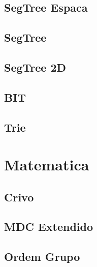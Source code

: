 \documentclass[12pt, a4paper, twoside]{article}
\begin{document}
\subsection{SegTree Espaca}


\subsection{SegTree}


\subsection{SegTree 2D}


\subsection{BIT}


\subsection{Trie}




%
%

\section{Matematica}

\subsection{Crivo}


\subsection{MDC Extendido}


\subsection{Ordem Grupo}

\end{document}
